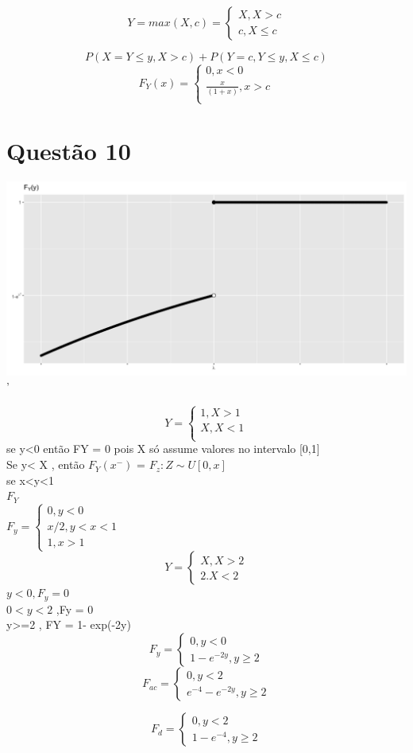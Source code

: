 \documentclass[a4paper,12pt]{report}
\begin{document}
$$Y=max(X,c)=\begin{cases}
X, X> c\\
c, X\le c
\end{cases} $$

$$P(X=Y\le y,X>c) + P(Y=c,Y\le y, X\le c) $$
$$F_Y(x)=\begin{cases}
0, x<0\\
\frac{x}{(1+x)},x>c\\


\end{cases}  $$
\section{Questão 10}

\includegraphics[width=\textwidth]{C2Q10.png}'

$$Y=\begin{cases}
1 , X>1\\
X, X<1\\
\end{cases} $$
se y<0 então FY = 0 pois X só assume valores no intervalo [0,1]\\
Se y< X , então $F_Y(x^-)$ = $F_z: Z\sim U[0,x]$\\
se  x<y<1\\
$F_Y$\\
$F_y = \begin{cases}
0, y<0\\
x/2 , y<x<1\\
1, x>1

\end{cases} $
$$
Y=\begin{cases}
X, X>2\\
2. X<2
\end{cases}
$$
$y<0, F_y=0 $\\
 $0<y<2 $ ,Fy = 0\\
 y>=2 , FY = 1- exp(-2y)
 $$F_y= \begin{cases}
 0, y<0\\
 1-e^{-2y} , y\ge 2
 \end{cases} 
 $$
 $$F_{ac} = \begin{cases}
0, y< 2\\
 e^{-4}-e^{-2y},y\ge2
 \end{cases} $$
 
 $$ F_d =\begin{cases}
 0, y<2\\
1-e^{-4}, y\ge 2
 
 \end{cases}$$ 
 



	
	
\end{document}
